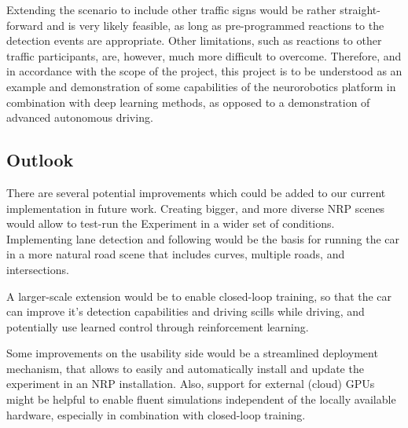 Extending the scenario to include other traffic signs would be rather straight-forward and is very likely feasible, as long as pre-programmed reactions to the detection events are appropriate. 
Other limitations, such as reactions to other traffic participants, are, however, much more difficult to overcome.
Therefore, and in accordance with the scope of the project, this project is to be understood as an example and demonstration of some capabilities of the neurorobotics platform in combination with deep learning methods, as opposed to a demonstration of advanced autonomous driving.

\subsection{Outlook}
There are several potential improvements which could be added to our current implementation in future work. 
Creating bigger, and more diverse NRP scenes would allow to test-run the Experiment in a wider set of conditions.
Implementing lane detection and following would be the basis for running the car in a more natural road scene that includes curves, multiple roads, and intersections. 

A larger-scale extension would be to enable closed-loop training, so that the car can improve it's detection capabilities and driving scills while driving, and potentially use learned control through reinforcement learning.

Some improvements on the usability side would be a streamlined deployment mechanism, that allows to easily and automatically install and update the experiment in an NRP installation. Also, support for external (cloud) GPUs might be helpful to enable fluent simulations independent of the locally available hardware, especially in combination with closed-loop training.
